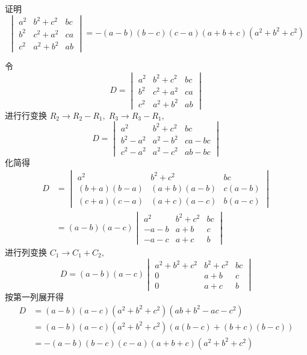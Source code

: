 \begin{questions}
    \question 证明$$ \begin{vmatrix}
        a^2 & b^2 + c^2 & bc \\
        b^2 & c^2 + a^2 & ca \\
        c^2 & a^2 + b^2 & ab
        \end{vmatrix}= -(a - b)(b - c)(c - a)(a + b + c)(a^2 + b^2 + c^2)$$
    \begin{solution}
        令
        \[
        D = \begin{vmatrix}
        a^2 & b^2 + c^2 & bc \\
        b^2 & c^2 + a^2 & ca \\
        c^2 & a^2 + b^2 & ab
        \end{vmatrix}
        \]
        进行行变换 $R_2\rightarrow R_2-R_1,\;R_3\rightarrow R_3-R_1,$
        \[D=
        \begin{vmatrix}
        a^2 & b^2 + c^2 & bc \\
        b^2 - a^2 & a^2 - b^2 & ca - bc \\
        c^2 - a^2 & a^2 - c^2 & ab - bc
        \end{vmatrix}
        \]
        化简得
        \begin{align*}
        D&=\begin{vmatrix}
        a^2 & b^2 + c^2 & bc \\
        (b+a)(b-a)& (a+b)(a-b) & c(a - b) \\
        (c+a)(c-a) & (a+c)(a-c) & b(a - c)
        \end{vmatrix} \\
        &= (a-b)(a-c)\begin{vmatrix}
        a^2 & b^2 + c^2 & bc \\
        -a-b& a+b & c \\
        -a-c & a+c & b
        \end{vmatrix} 
        \end{align*}
        进行列变换 $C_1 \rightarrow C_1+C_2,$
        \[
        D=(a-b)(a-c)\begin{vmatrix}
        a^2+b^2+c^2 & b^2 + c^2 & bc \\
        0& a+b & c \\
        0 & a+c & b
        \end{vmatrix}         
        \]
        按第一列展开得
        \begin{align*}
        D&=(a-b)(a-c)(a^2+b^2+c^2)(ab+b^2-ac-c^2)\\
        &=(a-b)(a-c)(a^2+b^2+c^2)(a(b-c)+(b+c)(b-c))\\
        &=-(a - b)(b - c)(c - a)(a + b + c)(a^2 + b^2 + c^2)
        \end{align*}
    \end{solution}
        

\end{questions}
